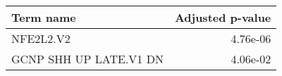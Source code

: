 \begin{tabular}{lr}
\toprule
             Term name &  Adjusted p-value \\
\midrule
             NFE2L2.V2 &          4.76e-06 \\
GCNP SHH UP LATE.V1 DN &          4.06e-02 \\
\bottomrule
\end{tabular}
